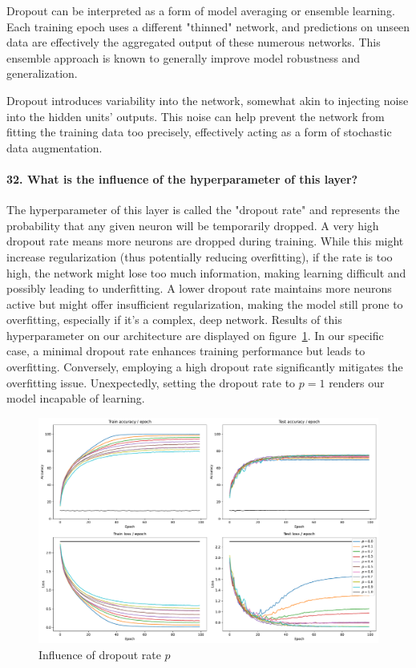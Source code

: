 \documentclass{article}
\theoremstyle{plain}%
\theoremstyle{definition}
\theoremstyle{remark}
\begin{document}
Dropout can be interpreted as a form of model averaging or ensemble learning. Each training epoch uses a different "thinned" network, and predictions on unseen data are effectively the aggregated output of these numerous networks. This ensemble approach is known to generally improve model robustness and generalization.

Dropout introduces variability into the network, somewhat akin to injecting noise into the hidden units' outputs. This noise can help prevent the network from fitting the training data too precisely, effectively acting as a form of stochastic data augmentation.

\paragraph{32. What is the influence of the hyperparameter of this layer?}
The hyperparameter of this layer is called the "dropout rate" and represents the probability that any given neuron will be temporarily dropped. A very high dropout rate means more neurons are dropped during training. While this might increase regularization (thus potentially reducing overfitting), if the rate is too high, the network might lose too much information, making learning difficult and possibly leading to underfitting. A lower dropout rate maintains more neurons active but might offer insufficient regularization, making the model still prone to overfitting, especially if it's a complex, deep network. Results of this hyperparameter on our architecture are displayed on figure~\ref{fig:dropout_hyperparameter}. In our specific case, a minimal dropout rate enhances training performance but leads to overfitting. Conversely, employing a high dropout rate significantly mitigates the overfitting issue. Unexpectedly, setting the dropout rate to $p=1$ renders our model incapable of learning.

\begin{figure}[H]
    \centering
    \includegraphics*[width=\textwidth]{figs/CNN/dropout_hyperparameter.pdf}
    \caption{Influence of dropout rate $p$}
    \label{fig:dropout_hyperparameter}
\end{figure}
\end{document}
